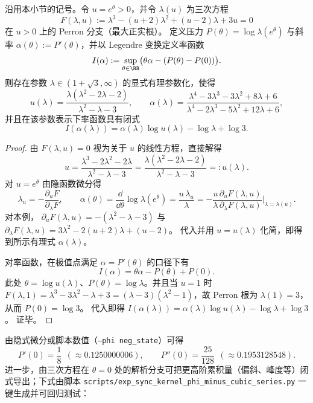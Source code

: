 \begin{proposition}\label{prop:vector-potential-phi-minus-ldp-param}
沿用本小节的记号。令 \(u=e^{\theta}>0\)，并令 \(\lambda(u)\) 为三次方程
\[
F(\lambda,u):=\lambda^3-(u+2)\lambda^2+(u-2)\lambda+3u=0
\]
在 \(u>0\) 上的 Perron 分支（最大正实根）。
定义压力 \(P(\theta)=\log\lambda(e^\theta)\) 与斜率 \(\alpha(\theta):=P'(\theta)\)，并以 Legendre 变换定义率函数
\[
I(\alpha):=\sup_{\theta\in\RR}\bigl(\theta\alpha-(P(\theta)-P(0))\bigr).
\]
则存在参数 \(\lambda\in(1+\sqrt3,\infty)\) 的显式有理参数化，使得
\[
u(\lambda)=\frac{\lambda(\lambda^{2}-2\lambda-2)}{\lambda^{2}-\lambda-3},
\qquad
\alpha(\lambda)=\frac{\lambda^{4}-3\lambda^{3}-3\lambda^{2}+8\lambda+6}{\lambda^{4}-2\lambda^{3}-5\lambda^{2}+12\lambda+6},
\]
并且在该参数表示下率函数具有闭式
\[
I(\alpha(\lambda))=\alpha(\lambda)\log u(\lambda)-\log\lambda+\log 3.
\]
\end{proposition}
\begin{proof}
由 \(F(\lambda,u)=0\) 视为关于 \(u\) 的线性方程，直接解得
\[
u=\frac{\lambda^{3}-2\lambda^{2}-2\lambda}{\lambda^{2}-\lambda-3}
=\frac{\lambda(\lambda^{2}-2\lambda-2)}{\lambda^{2}-\lambda-3}
=:u(\lambda).
\]
对 \(u=e^{\theta}\) 由隐函数微分得
\[
\lambda_u=-\frac{\partial_u F}{\partial_\lambda F},
\qquad
\alpha(\theta)=\frac{\dd}{\dd\theta}\log\lambda(e^\theta)=\frac{u\,\lambda_u}{\lambda}
=-\frac{u\,\partial_u F(\lambda,u)}{\lambda\,\partial_\lambda F(\lambda,u)}\Bigg|_{\lambda=\lambda(u)}.
\]
对本例，
\(
\partial_u F(\lambda,u)=-(\lambda^2-\lambda-3)
\)
与
\(
\partial_\lambda F(\lambda,u)=3\lambda^2-2(u+2)\lambda+(u-2)
\)。
代入并用 \(u=u(\lambda)\) 化简，即得到所示有理式 \(\alpha(\lambda)\)。
\par
对率函数，在极值点满足 \(\alpha=P'(\theta)\) 的口径下有
\[
I(\alpha)=\theta\alpha-P(\theta)+P(0).
\]
此处 \(\theta=\log u(\lambda)\)、\(P(\theta)=\log\lambda\)。并且当 \(u=1\) 时
\(
F(\lambda,1)=\lambda^{3}-3\lambda^{2}-\lambda+3=(\lambda-3)(\lambda^{2}-1)
\)，故 Perron 根为 \(\lambda(1)=3\)，从而 \(P(0)=\log 3\)。
代入即得
\(
I(\alpha(\lambda))=\alpha(\lambda)\log u(\lambda)-\log\lambda+\log 3
\)。
证毕。
\end{proof}

由隐式微分或脚本数值（\texttt{--phi neg\_state}）可得
\[
P'(0)=\frac{1}{8}\ \ (\approx 0.1250000006),\qquad
P''(0)=\frac{25}{128}\ \ (\approx 0.1953128548).
\]
进一步，由三次方程在 \(\theta=0\) 处的解析分支可把更高阶累积量（偏斜、峰度等）闭式导出；下式由脚本 \texttt{scripts/exp\_sync\_kernel\_phi\_minus\_cubic\_series.py} 一键生成并可回归测试：

